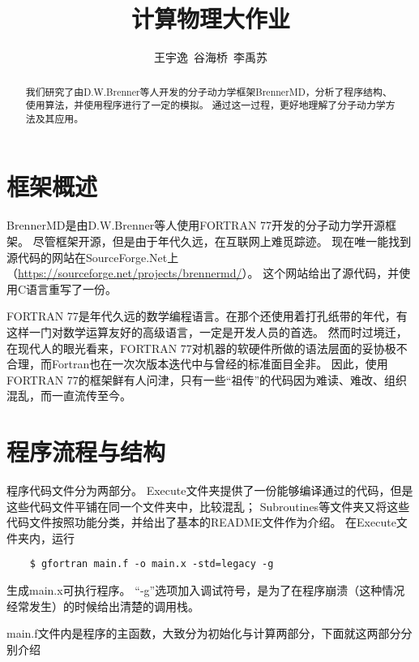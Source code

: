 \documentclass[UTF-8]{ctexart}
\title{计算物理大作业}
\author{王宇逸\ 谷海桥\ 李禹苏}
\begin{document}
\maketitle
\newpage
\tableofcontents
\newpage

\begin{abstract}
    我们研究了由D.W.Brenner等人开发的分子动力学框架BrennerMD，分析了程序结构、使用算法，并使用程序进行了一定的模拟。
    通过这一过程，更好地理解了分子动力学方法及其应用。
\end{abstract}

\section{框架概述}
BrennerMD是由D.W.Brenner等人使用FORTRAN 77开发的分子动力学开源框架。
尽管框架开源，但是由于年代久远，在互联网上难觅踪迹。
现在唯一能找到源代码的网站在SourceForge.Net上（\url{https://sourceforge.net/projects/brennermd/}）。
这个网站给出了源代码，并使用C语言重写了一份。

FORTRAN 77是年代久远的数学编程语言。在那个还使用着打孔纸带的年代，有这样一门对数学运算友好的高级语言，一定是开发人员的首选。
然而时过境迁，在现代人的眼光看来，FORTRAN 77对机器的软硬件所做的语法层面的妥协极不合理，而Fortran也在一次次版本迭代中与曾经的标准面目全非。
因此，使用FORTRAN 77的框架鲜有人问津，只有一些“祖传”的代码因为难读、难改、组织混乱，而一直流传至今。

\section{程序流程与结构}
程序代码文件分为两部分。
Execute文件夹提供了一份能够编译通过的代码，但是这些代码文件平铺在同一个文件夹中，比较混乱；
Subroutines等文件夹又将这些代码文件按照功能分类，并给出了基本的README文件作为介绍。
在Execute文件夹内，运行
\begin{verbatim}
    $ gfortran main.f -o main.x -std=legacy -g
\end{verbatim}
生成main.x可执行程序。
“-g”选项加入调试符号，是为了在程序崩溃（这种情况经常发生）的时候给出清楚的调用栈。

main.f文件内是程序的主函数，大致分为初始化与计算两部分，下面就这两部分分别介绍
\end{document}
